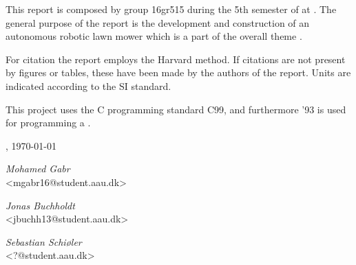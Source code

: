 This report is composed by group 16gr515 during the 5th semester of \projectFaculty{} at \AAU{}. The general purpose of the report is the development and construction of an autonomous robotic lawn mower which is a part of the overall theme \textit{\projectTheme}. 

For citation the report employs the Harvard method. If citations are not present by figures or tables, these have been made by the authors of the report. Units are indicated according to the SI standard.


This project uses the C programming standard C99, and furthermore '93 is used for programming a .

\vspace{\baselineskip}\hfill \AAU, \today
\vfill\noindent
\begin{center}
\begin{minipage}[b]{0.45\textwidth}
 \centering
  \textit{Mohamed Gabr}\\
 {\footnotesize <mgabr16@student.aau.dk>}
\end{minipage}
\hspace{0.3cm}
\begin{minipage}[b]{0.45\textwidth}
 \centering
  \textit{Jonas Buchholdt}\\
 {\footnotesize <jbuchh13@student.aau.dk>}
\end{minipage}
\end{center}
\vspace{1\baselineskip}
\begin{center}
\begin{minipage}[b]{0.45\textwidth}
 \centering
  \textit{Sebastian Schiøler}\\
 {\footnotesize <?@student.aau.dk>}
\end{minipage}
\hspace{0.3cm}
\begin{minipage}[b]{0.45\textwidth}
 \centering
  \textit{}\\
 {}
\end{minipage}
\end{center}

